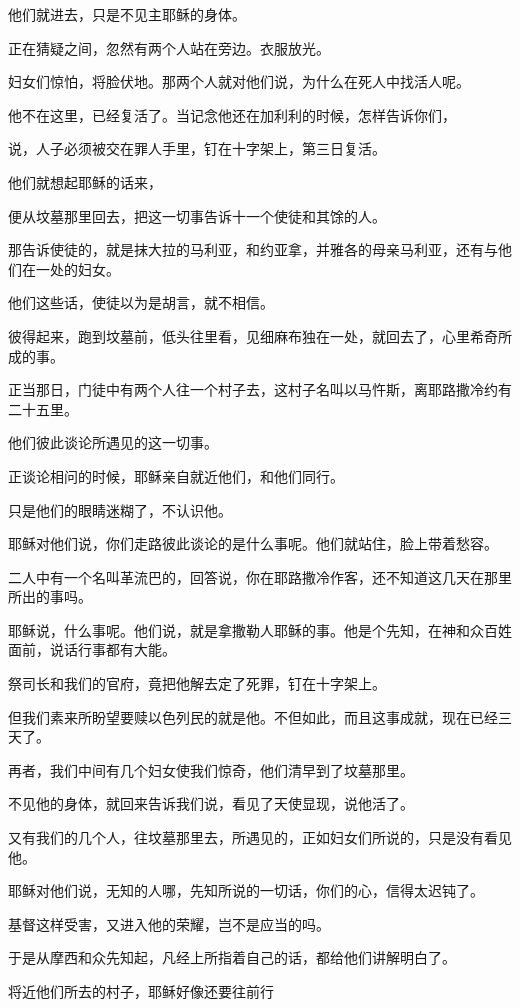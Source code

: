 \documentclass[12pt,oneside]{book}
\begin{document}
他们就进去，只是不见主耶稣的身体。

正在猜疑之间，忽然有两个人站在旁边。衣服放光。

妇女们惊怕，将脸伏地。那两个人就对他们说，为什么在死人中找活人呢。

他不在这里，已经复活了。当记念他还在加利利的时候，怎样告诉你们，

说，人子必须被交在罪人手里，钉在十字架上，第三日复活。

他们就想起耶稣的话来，

便从坟墓那里回去，把这一切事告诉十一个使徒和其馀的人。

那告诉使徒的，就是抹大拉的马利亚，和约亚拿，并雅各的母亲马利亚，还有与他们在一处的妇女。

他们这些话，使徒以为是胡言，就不相信。

彼得起来，跑到坟墓前，低头往里看，见细麻布独在一处，就回去了，心里希奇所成的事。

正当那日，门徒中有两个人往一个村子去，这村子名叫以马忤斯，离耶路撒冷约有二十五里。

他们彼此谈论所遇见的这一切事。

正谈论相问的时候，耶稣亲自就近他们，和他们同行。

只是他们的眼睛迷糊了，不认识他。

耶稣对他们说，你们走路彼此谈论的是什么事呢。他们就站住，脸上带着愁容。

二人中有一个名叫革流巴的，回答说，你在耶路撒冷作客，还不知道这几天在那里所出的事吗。

耶稣说，什么事呢。他们说，就是拿撒勒人耶稣的事。他是个先知，在神和众百姓面前，说话行事都有大能。

祭司长和我们的官府，竟把他解去定了死罪，钉在十字架上。

但我们素来所盼望要赎以色列民的就是他。不但如此，而且这事成就，现在已经三天了。

再者，我们中间有几个妇女使我们惊奇，他们清早到了坟墓那里。

不见他的身体，就回来告诉我们说，看见了天使显现，说他活了。

又有我们的几个人，往坟墓那里去，所遇见的，正如妇女们所说的，只是没有看见他。

耶稣对他们说，无知的人哪，先知所说的一切话，你们的心，信得太迟钝了。

基督这样受害，又进入他的荣耀，岂不是应当的吗。

于是从摩西和众先知起，凡经上所指着自己的话，都给他们讲解明白了。

将近他们所去的村子，耶稣好像还要往前行
\end{document}
